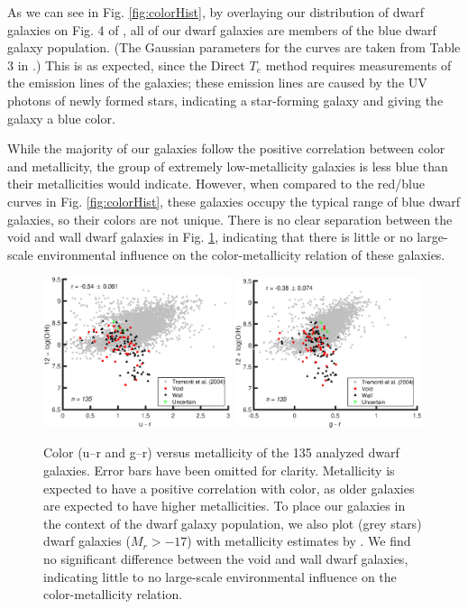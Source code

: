 As we can see in Fig. \ref{fig:colorHist}, by overlaying our distribution of 
dwarf galaxies on Fig. 4 of \cite{Hoyle12}, all of our dwarf galaxies are 
members of the blue dwarf galaxy population.  (The Gaussian parameters for the 
curves are taken from Table 3 in \cite{Hoyle12}.)  This is as expected, since 
the Direct $T_e$ method requires measurements of the emission lines of the 
galaxies; these emission lines are caused by the UV photons of newly formed 
stars, indicating a star-forming galaxy and giving the galaxy a blue color.

While the majority of our galaxies follow the positive correlation between color 
and metallicity, the group of extremely low-metallicity galaxies is less blue 
than their metallicities would indicate.  However, when compared to the red/blue 
curves in Fig. \ref{fig:colorHist}, these galaxies occupy the typical range of 
blue dwarf galaxies, so their colors are not unique.  There is no clear 
separation between the void and wall dwarf galaxies in Fig. 
\ref{fig:colorZ_relation}, indicating that there is little or no large-scale 
environmental influence on the color-metallicity relation of these galaxies.

\begin{figure}
    \centering
    \includegraphics[width=0.49\textwidth]{Images/Paper1/ur_OH_1sig_I06_dwarf_SF_t3}
    \includegraphics[width=0.49\textwidth]{Images/Paper1/gr_OH_1sig_I06_dwarf_SF_t3}
    \caption[Color versus metallicity for 135 dwarf galaxy sample]{Color (u--r 
    and g--r) versus metallicity of the 135 analyzed dwarf galaxies.  Error bars 
    have been omitted for clarity.  Metallicity is expected to have a positive 
    correlation with color, as older galaxies are expected to have higher 
    metallicities.  To place our galaxies in the context of the dwarf galaxy 
    population, we also plot (grey stars) dwarf galaxies ($M_r > -17$) with 
    metallicity estimates by \cite{Tremonti04}.  We find no significant 
    difference between the void and wall dwarf galaxies, indicating little to no 
    large-scale environmental influence on the color-metallicity relation.}
    \label{fig:colorZ_relation}
\end{figure}

